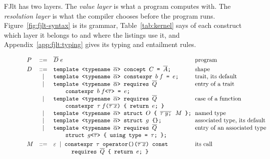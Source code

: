 FJlt has two layers.
The \emph{value layer} is what a program computes with.
The \emph{resolution layer} is what the compiler chooses before the program runs.
Figure~\ref{fig:fjlt-syntax} is its grammar, Table~\ref{tab:kernel} says of each construct which layer it belongs to and where the listings use it, and Appendix~\ref{app:fjlt:typing} gives its typing and entailment rules.

\begin{figure}[htbp]
\[
\begin{array}{lcl@{\hspace{0.6em}}l}
P &::=& \overline{D}\; e & \text{program} \\[3pt]
D &::=& \texttt{template <typename }\overline{\alpha}\texttt{> concept } C \texttt{ = } \overline{A}\texttt{;} & \text{shape} \\
  & \mid & \texttt{template <typename }\overline{\alpha}\texttt{> constexpr } b\; f \texttt{ = } e\texttt{;} & \text{trait, its default} \\
  & \mid & \texttt{template <typename }\overline{\alpha}\texttt{> requires } \overline{Q} & \text{entry of a trait} \\
  &   & \qquad \texttt{constexpr } b\; f\texttt{<}\overline{\tau}\texttt{>} \texttt{ = } e\texttt{;} & \\
  & \mid & \texttt{template <typename }\overline{\alpha}\texttt{> requires } \overline{Q} & \text{case of a function} \\
  &   & \qquad \texttt{constexpr } \tau\; f\texttt{(}\overline{\tau\; x}\texttt{) \{ return } e\texttt{; \}} & \\
  & \mid & \texttt{template <typename }\overline{\alpha}\texttt{> struct } O \texttt{ \{ } \overline{\tau\; y\texttt{;}}\ \ M \texttt{ \};} & \text{named type} \\
  & \mid & \texttt{template <typename }\overline{\alpha}\texttt{> struct } g \texttt{ \{\};} & \text{associated type, its default} \\
  & \mid & \texttt{template <typename }\overline{\alpha}\texttt{> requires } \overline{Q} & \text{entry of an associated type} \\
  &   & \qquad \texttt{struct } g\texttt{<}\overline{\tau}\texttt{> \{ using type = } \tau \texttt{; \};} & \\[3pt]
M &::=& \varepsilon \;\mid\; \texttt{constexpr } \tau \texttt{ operator()(}\overline{\tau\; x}\texttt{) const} & \text{its call} \\
  &   & \qquad\quad \texttt{requires } \overline{Q} \texttt{ \{ return } e\texttt{; \}} & \\[3pt]

\end{array}\]
\end{figure}
